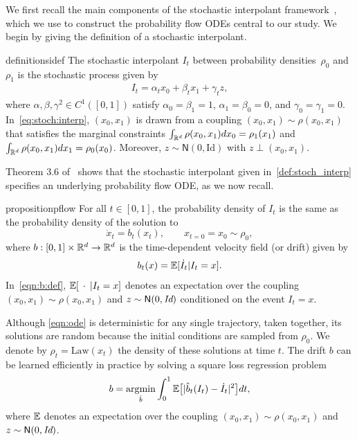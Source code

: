 We first recall the main components of the stochastic interpolant framework~\citep{albergo2022building,albergo2023stochastic}, which we use to construct the probability flow ODEs central to our study.
%
We begin by giving the definition of a stochastic interpolant.
%
\begin{restatable}{definition}{sidef}
	\label{def:stoch_interp}
	The stochastic interpolant $I_t$ between probability densities~$\rho_0$ and~$\rho_1$ is the stochastic process given by
	\begin{align}
		\label{eq:stoch:interp}
		I_t = \alpha_t x_0 + \beta_t x_1 + \gamma_t z,
	\end{align}
	where $\alpha, \beta, \gamma^2 \in C^1([0, 1])$ satisfy $\alpha_0 = \beta_1 = 1$, $\alpha_1 = \beta_0 = 0$, and $\gamma_0 = \gamma_1 = 0$.
	In~\eqref{eq:stoch:interp}, $(x_0, x_1)$ is drawn from a coupling $(x_0, x_1) \sim \rho(x_0, x_1)$ that satisfies the marginal constraints $\int_{\mathbb{R}^d}\rho(x_0, x_1) dx_0 = \rho_1(x_1)$ and $\int_{\mathbb{R}^d}\rho(x_0, x_1) dx_1 = \rho_0(x_0)$.
	Moreover, $z \sim \mathsf{N}(0, \text{Id})$ with $z\perp(x_0,x_1)$.
\end{restatable}
%
\noindent
%
Theorem 3.6 of~\cite{albergo2023stochastic} shows that the stochastic interpolant given in~\cref{def:stoch_interp} specifies an underlying probability flow ODE, as we now recall.
%
\begin{restatable}{proposition}{pflow}
	\label{thm:stoch_interp}
	For all $t\in[0,1]$, the probability density of $I_t$ is the same as the probability density of the solution to
	\begin{equation}
		\label{eqn:ode}
		\dot{x}_t = b_t(x_t), \qquad x_{t=0} = x_0 \sim \rho_0,
	\end{equation}
	where $b: [0,1]\times \mathbb{R}^d\rightarrow\mathbb{R}^d$ is the time-dependent velocity field (or drift)  given by
	\begin{equation}
		\label{eqn:b:def}
		b_t(x) = \mathbb{E}[\dot{I}_t | I_t = x].
	\end{equation}
	In~\eqref{eqn:b:def}, $\mathbb{E}[\:\:\cdot\:\:|I_t = x]$ denotes an expectation over the coupling $(x_0, x_1) \sim \rho(x_0, x_1)$ and $z \sim \mathsf N(0, \text{\it Id})$ conditioned on the event $I_t=x$.
\end{restatable}
%
Although \eqref{eqn:ode} is deterministic for any single trajectory, taken together, its solutions are random because the initial conditions are sampled from $\rho_0$.
%
We denote by $\rho_t=\text{Law}(x_t)$ the density of these solutions at time $t$.
%
The drift  $b$ can be learned efficiently in practice by solving a square loss regression problem~\citep{albergo2023stochastic}
\begin{equation}
	\label{eq:loss:b}
	b = \operatorname*{arg\!\min}_{\hat b} \int_0^1 \mathbb{E} \big[ | \hat b_t(I_t) - \dot I_t|^2 \big] dt,
\end{equation}
where $\mathbb{E}$ denotes an expectation over the coupling $(x_0, x_1) \sim \rho(x_0, x_1)$ and $z \sim \mathsf N(0, \text{\it Id})$.

